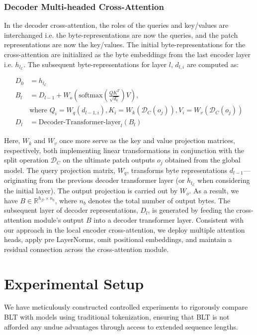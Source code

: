 \subsubsection{Decoder Multi-headed Cross-Attention} 

In the decoder cross-attention, the roles of the queries and key/values are interchanged i.e. the byte-representations are now the queries, and the patch representations are now the key/values. The initial byte-representations for the cross-attention are initialized as the byte embeddings from the last encoder layer i.e. $h_{l_{\mathcal{E}}}$. The subsequent byte-representations for layer $l$, $d_{l,i}$ are computed as:

\begin{align}
D_0 &= h_{l_{\mathcal{E}}} \\
B_l &= D_{l-1} + W_o\left(\text{softmax}\left(\frac{QK^T}{\sqrt{d_k}}\right)V\right), \\
  &\text{where } Q_i = W_q(d_{l-1,i}), K_i = W_k(\mathcal{D}_C(o_j)), V_i = W_v(\mathcal{D}_C(o_j)) \\
  D_l &= \text{Decoder-Transformer-layer}_l(B_l)
\end{align}

Here, $W_k$ and $W_v$ once more serve as the key and value projection matrices, respectively, both implementing linear transformations in conjunction with the split operation $\mathcal{D}_C$ on the ultimate patch outputs $o_j$ obtained from the global model. The query projection matrix, $W_q$, transforms byte representations $d_{l-1}$—originating from the previous decoder transformer layer (or $h_{l_{\mathcal{E}}}$ when considering the initial layer). The output projection is carried out by $W_o$. As a result, we have $B \in \mathbb{R}^{h_{\mathcal{D}} \times n_b}$, where $n_b$ denotes the total number of output bytes. The subsequent layer of decoder representations, $D_l$, is generated by feeding the cross-attention module’s output $B$ into a decoder transformer layer. Consistent with our approach in the local encoder cross-attention, we deploy multiple attention heads, apply pre LayerNorms, omit positional embeddings, and maintain a residual connection across the cross-attention module.

\section{Experimental Setup}
\label{section:experiments}
We have meticulously constructed controlled experiments to rigorously compare {\textsc BLT} with models using traditional tokenization, ensuring that {\textsc BLT} is not afforded any undue advantages through access to extended sequence lengths.

